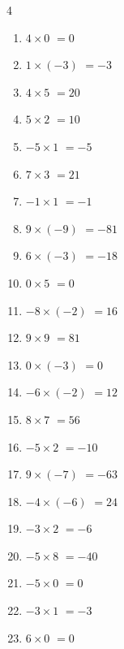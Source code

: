 \begin{multicols}{4}
\begin{enumerate}
  \item $4\times 0$
        $=0$

  \item $1\times (-3)$
        $=-3$

  \item $4\times 5$
        $=20$

  \item $5\times 2$
        $=10$

  \item $-5\times 1$
        $=-5$

  \item $7\times 3$
        $=21$

  \item $-1\times 1$
        $=-1$

  \item $9\times (-9)$
        $=-81$

  \item $6\times (-3)$
        $=-18$

  \item $0\times 5$
        $=0$

  \item $-8\times (-2)$
        $=16$

  \item $9\times 9$
        $=81$

  \item $0\times (-3)$
        $=0$

  \item $-6\times (-2)$
        $=12$

  \item $8\times 7$
        $=56$

  \item $-5\times 2$
        $=-10$

  \item $9\times (-7)$
        $=-63$

  \item $-4\times (-6)$
        $=24$

  \item $-3\times 2$
        $=-6$

  \item $-5\times 8$
        $=-40$

  \item $-5\times 0$
        $=0$

  \item $-3\times 1$
        $=-3$

  \item $6\times 0$
        $=0$


\end{enumerate}
\end{multicols}
